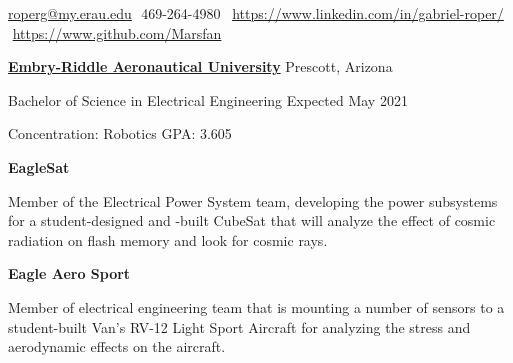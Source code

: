 \documentclass[letterpaper,ddMMMyyyy,nonstopmode]{simpleresumecv}
\makeatletter
\newcommand{\CVAuthor}{Gabriel Roper}
\newcommand{\LinkedInPage}{https://www.linkedin.com/in/gabriel-roper/}
\newcommand{\GithubPage}{https://www.github.com/Marsfan}
\newcommand{\emailAddress}{roperg@my.erau.edu}
\newcommand{\streetAddress}{}
\newcommand{\phoneNumber}{469-264-4980}
\newcommand{\descriptionWidth}{33em}
\newenvironment{Description}
{%
	\SmallGap
	\par
	\begin{Detail}
		\Item
		\begin{minipage}{\descriptionWidth}
}
{\par
\end{minipage}
\end{Detail}
}
\makeatother
\begin{document}
	\Title{\CVAuthor}

	\begin{SubTitle}
		{\streetAddress}
		\par
		\href{mailto:\emailAddress}{\emailAddress}
		\BulletSymbol
		\,\,\phoneNumber\,
		\BulletSymbol
		\,\,\href{\LinkedInPage}{\url{\LinkedInPage}}
		\BulletSymbol
		\,\,\href{\GithubPage}{\url{\GithubPage}}
	\end{SubTitle}

	\begin{Body}



            \Entry
            \href{https://prescott.erau.edu}{\textbf{Embry-Riddle Aeronautical University}}
            \hfill Prescott, Arizona

            Bachelor of Science in Electrical Engineering
            \hfill Expected May 2021

            Concentration: Robotics
            \hfill GPA: 3.605





            \Entry
            \textbf{EagleSat}
            \hfill

            \begin{Description}
                    Member of the Electrical Power System team, developing the power subsystems for a student-designed and -built CubeSat that will analyze the effect of cosmic radiation on flash memory and look for cosmic rays.
            \end{Description}
            \Gap

            \Entry
            \textbf{Eagle Aero Sport}
            \hfill

            \begin{Description}
                    Member of electrical engineering team that is mounting a number of sensors to a student-built Van's RV-12 Light Sport Aircraft for analyzing the stress and aerodynamic effects on the aircraft.
            \end{Description}
            \Gap


\end{Body}
\end{document}

